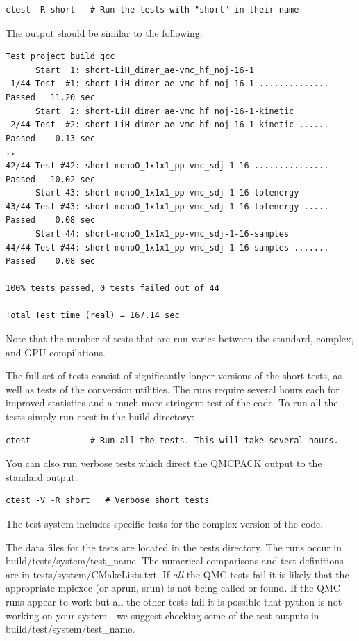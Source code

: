 \begin{verbatim}
ctest -R short   # Run the tests with "short" in their name
\end{verbatim}
The output should be similar to the following:
\begin{verbatim}
Test project build_gcc
      Start  1: short-LiH_dimer_ae-vmc_hf_noj-16-1
 1/44 Test  #1: short-LiH_dimer_ae-vmc_hf_noj-16-1 ..............  Passed   11.20 sec
      Start  2: short-LiH_dimer_ae-vmc_hf_noj-16-1-kinetic
 2/44 Test  #2: short-LiH_dimer_ae-vmc_hf_noj-16-1-kinetic ......  Passed    0.13 sec
..
42/44 Test #42: short-monoO_1x1x1_pp-vmc_sdj-1-16 ...............  Passed   10.02 sec
      Start 43: short-monoO_1x1x1_pp-vmc_sdj-1-16-totenergy
43/44 Test #43: short-monoO_1x1x1_pp-vmc_sdj-1-16-totenergy .....  Passed    0.08 sec
      Start 44: short-monoO_1x1x1_pp-vmc_sdj-1-16-samples
44/44 Test #44: short-monoO_1x1x1_pp-vmc_sdj-1-16-samples .......  Passed    0.08 sec

100% tests passed, 0 tests failed out of 44

Total Test time (real) = 167.14 sec
\end{verbatim}
Note that the number of tests that are run varies between the
standard, complex, and GPU compilations.

The  full set of tests consist of significantly longer versions of the short
tests, as well as tests of the conversion utilities. The runs require
several hours each for improved statistics and a much more
stringent test of the code. To run all the tests simply run ctest in the build
directory:

\begin{verbatim}
ctest            # Run all the tests. This will take several hours.
\end{verbatim}

You can also run verbose tests which direct the QMCPACK
output to the standard output:
\begin{verbatim}
ctest -V -R short   # Verbose short tests
\end{verbatim}

The test system includes specific tests for the complex version of the code.

The data files for the tests are located in the tests directory. The
runs occur in build/tests/system/test\_name. The numerical
comparisons and test definitions are in
tests/system/CMakeLists.txt. If \textit{all} the QMC tests fail it is likely
that the appropriate mpiexec (or aprun, srun) is not being
called or found. If the QMC runs appear to work but all the other
tests fail it is possible that python is not working on your system -
we suggest checking some of the test outputs in build/test/system/test\_name.

